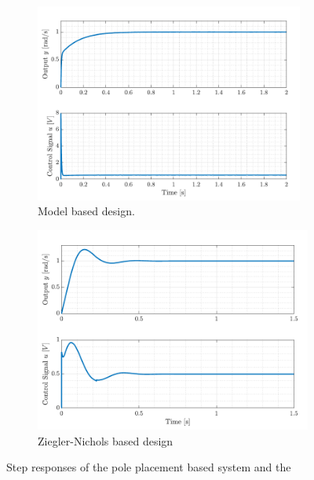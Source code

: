\documentclass[../../main.tex]{subfiles}
\begin{document}
\begin{figure}[]
\begin{subfigure}{0.48\textwidth}
     \includegraphics[width = 0.97\textwidth]{Sections/System_Design/Images/VelControllerPP.pdf}
    \caption{Model based design.}
    \label{fig:step_vel_model}
\end{subfigure}\hfill
\begin{subfigure}{0.48\textwidth}
    \includegraphics[width = 0.97 \textwidth]{Sections/System_Design/Images/VelControllerZN.pdf}
    \caption{Ziegler-Nichols based design}
    \label{fig:step_vel_ZN}
\end{subfigure}
\caption{Step responses of the pole placement based system and the }
\label{fig:vel_step}
\end{figure}
\end{document}
